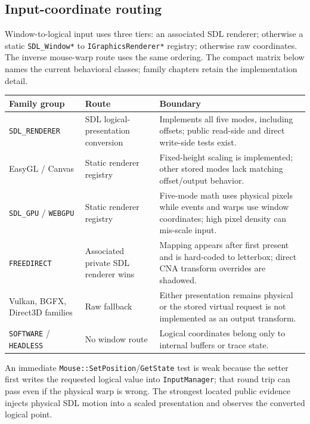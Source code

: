 \subsection{Input-coordinate routing}
\label{sec:backend-input-coordinate-matrix}

Window-to-logical input uses three tiers: an associated SDL renderer; otherwise a static
\texttt{SDL\_Window*} to \texttt{IGraphicsRenderer*} registry; otherwise raw coordinates. The
inverse mouse-warp route uses the same ordering. The compact matrix below names the current
behavioral classes; family chapters retain the implementation detail.

\begin{center}
\small
\begin{tabular}{@{}p{}p{}p{}@{}}
\toprule
\textbf{Family group} & \textbf{Route} & \textbf{Boundary} \\
\midrule
\texttt{SDL\_RENDERER} & SDL logical-presentation conversion & Implements all five modes, including offsets; public read-side and direct write-side tests exist. \\
EasyGL / Canvas & Static renderer registry & Fixed-height scaling is implemented; other stored modes lack matching offset/output behavior. \\
\texttt{SDL\_GPU} / \texttt{WEBGPU} & Static renderer registry & Five-mode math uses physical pixels while events and warps use window coordinates; high pixel density can mis-scale input. \\
\texttt{FREEDIRECT} & Associated private SDL renderer wins & Mapping appears after first present and is hard-coded to letterbox; direct CNA transform overrides are shadowed. \\
Vulkan, BGFX, Direct3D families & Raw fallback & Either presentation remains physical or the stored virtual request is not implemented as an output transform. \\
\texttt{SOFTWARE} / \texttt{HEADLESS} & No window route & Logical coordinates belong only to internal buffers or trace state. \\
\bottomrule
\end{tabular}
\end{center}

An immediate \texttt{Mouse::SetPosition}/\texttt{GetState} test is weak because the setter first
writes the requested logical value into \texttt{InputManager}; that round trip can pass even if
the physical warp is wrong. The strongest located public evidence injects physical SDL motion
into a scaled presentation and observes the converted logical point.


